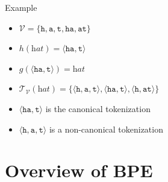 \documentclass[11pt,compress,t,notes=noshow, xcolor=table]{beamer}
\newcommand{\vocab}{\mathcal{V}}
\begin{document}
\begin{frame}{Example}

\vfill

\begin{itemize}
\item $\vocab = \{ \texttt{h},\texttt{a}, \texttt{t}, \texttt{ha}, \texttt{at} \}$
\item $h(\textit{hat}) = \langle \texttt{ha}, \texttt{t}\rangle$
\item $g(\langle \texttt{ha}, \texttt{t}\rangle) = \textit{hat} $
\item $\mathcal{T}_{\vocab}(\textit{hat}) = \{ \langle \texttt{h}, \texttt{a}, \texttt{t}\rangle, \langle \texttt{ha}, \texttt{t}\rangle, \langle \texttt{h}, \texttt{at}\rangle \}$
\item $\langle \texttt{ha}, \texttt{t}\rangle$ is the canonical tokenization
\item $\langle \texttt{h}, \texttt{a}, \texttt{t}\rangle$ is a non-canonical tokenization
\end{itemize}

\vfill

\end{frame}



\section{Overview of BPE}
\end{document}
